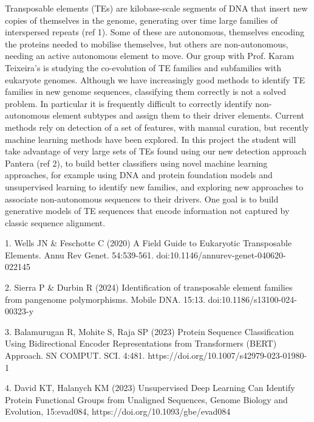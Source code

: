 \documentclass[12pt]{article}
\begin{document}
Transposable elements (TEs) are kilobase-scale segments of DNA that insert new copies of themselves in the genome, generating over time large families of interspersed repeats (ref 1). Some of these are autonomous, themselves encoding the proteins needed to mobilise themselves, but others are non-autonomous, needing an active autonomous element to move. Our group with Prof. Karam Teixeira’s is studying the co-evolution of TE families and subfamilies with eukaryote genomes. Although we have increasingly good methods to identify TE families in new genome sequences, classifying them correctly is not a solved problem. In particular it is frequently difficult to correctly identify non-autonomous element subtypes and assign them to their driver elements. Current methods rely on detection of a set of features, with manual curation, but recently machine learning methods have been explored. In this project the student will take advantage of very large sets of TEs found using our new detection approach Pantera (ref 2), to build better classifiers using novel machine learning approaches, for example using DNA and protein foundation models and unsupervised learning to identify new families, and exploring new approaches to associate non-autonomous sequences to their drivers. One goal is to build generative models of TE sequences that encode information not captured by classic sequence alignment.

1. Wells JN & Feschotte C (2020) A Field Guide to Eukaryotic Transposable Elements. Annu Rev Genet. 54:539-561. doi:10.1146/annurev-genet-040620-022145 

2. Sierra P & Durbin R (2024) Identification of transposable element families from pangenome polymorphisms. Mobile DNA. 15:13. doi:10.1186/s13100-024-00323-y 

3. Balamurugan R, Mohite S, Raja SP (2023) Protein Sequence Classification Using Bidirectional Encoder Representations from Transformers (BERT) Approach. SN COMPUT. SCI. 4:481. https://doi.org/10.1007/s42979-023-01980-1 

4. David KT, Halanych KM (2023) Unsupervised Deep Learning Can Identify Protein Functional Groups from Unaligned Sequences, Genome Biology and Evolution, 15:evad084, https://doi.org/10.1093/gbe/evad084 

\fi

\iffalse

\end{document}
